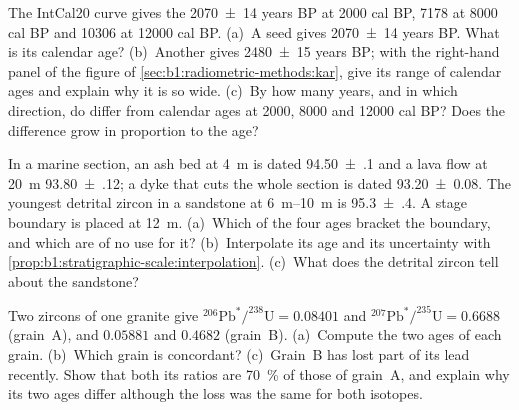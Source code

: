 \begin{exercise}[$\star\star$]\label{exo:b1:radiometric-methods:7}
The IntCal20 curve gives the  \num[uncertainty-mode=separate]{2070 \pm 14} years BP at \num{2000}
cal BP, \num{7178} at \num{8000} cal BP and \num{10306} at \num{12000} cal BP.
(a)~A seed gives \num[uncertainty-mode=separate]{2070 \pm 14} years BP. What is its
calendar age? (b)~Another gives \num[uncertainty-mode=separate]{2480 \pm 15} years
BP; with the right-hand panel of the figure of
\cref{sec:b1:radiometric-methods:kar}, give its range of calendar ages and explain
why it is so wide. (c)~By how many years, and in which direction, do  differ from calendar ages at \num{2000}, \num{8000} and \num{12000} cal BP?
Does the difference grow in proportion to the age?
\end{exercise}

\begin{exercise}[$\star\star$]\label{exo:b1:radiometric-methods:8}
In a marine section, an ash bed at \qty{4}{m} is dated
\qty[uncertainty-mode=separate]{94.50(10)}{\Ma} and a lava flow at \qty{20}{m}
\qty[uncertainty-mode=separate]{93.80(12)}{\Ma}; a dyke that cuts the whole
section is dated \qty[uncertainty-mode=separate]{93.20(8)}{\Ma}. The youngest
detrital zircon in a sandstone at \qtyrange{6}{10}{m} is
\qty[uncertainty-mode=separate]{95.3(4)}{\Ma}. A stage boundary is placed at
\qty{12}{m}. (a)~Which of the four ages bracket the boundary, and which are of no
use for it? (b)~Interpolate its age and its uncertainty with
\cref{prop:b1:stratigraphic-scale:interpolation}. (c)~What does the detrital
zircon tell about the sandstone?
\end{exercise}

\begin{exercise}[$\star\star$]\label{exo:b1:radiometric-methods:9}
Two zircons of one granite give
$^{206}\mathrm{Pb}^*/^{238}\mathrm{U} = 0.08401$ and
$^{207}\mathrm{Pb}^*/^{235}\mathrm{U} = 0.6688$ (grain~A), and $0.05881$ and
$0.4682$ (grain~B). (a)~Compute the two ages of each grain. (b)~Which grain is
concordant? (c)~Grain~B has lost part of its lead recently. Show that both its
ratios are \qty{70}{\percent} of those of grain~A, and explain why its two ages
differ although the loss was the same for both isotopes.
\end{exercise}

